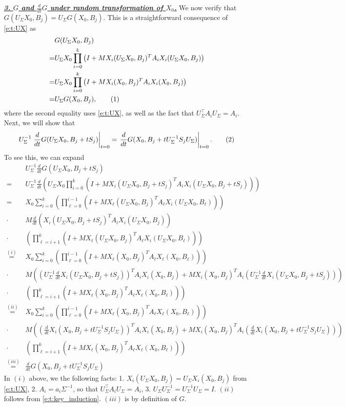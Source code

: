 \documentclass{article}
\newcommand{\emphh}[1]{\textbf{\emph{#1}}}
\newcommand*\lrp[1]{\left( #1 \right)}
\newcommand\numberthis{\addtocounter{equation}{1}\tag{\theequation}}
\newcommand*\at[2]{\left.#1\right|_{#2}}
\newcommand{\US}{U_\Sigma}
\begin{document}
\underline{\emphh{3. $G$ and $\frac{d}{dt} G$ under random transformation of $X_0$.}}
We now verify that $G(\US X_0, B_j) = \US G(X_0, B_j)$. This is a straightforward consequence of \eqref{e:t:UX} as
\begin{align*}
& G(\US X_0, B_j)\\
=& \US X_0 \prod_{i=0}^{k} \lrp{I + M X_i(\US X_0,B_j)^T A_i X_i(\US X_0,B_j)}\\
=& \US X_0 \prod_{i=0}^{k} \lrp{I + M X_i(X_0,B_j)^T A_i X_i(X_0,B_j)}\\
=& \US G(X_0, B_j),
\numberthis \label{e:t:UG}
\end{align*}
where the second equality uses \eqref{e:t:UX}, as well as the fact that $\US^\top A_i \US = A_i$. Next, we will show that
\begin{align*}
\US^{-1} \at{\frac{d}{dt} G(\US X_0, B_j + t S_j)}{t=0} = \at{\frac{d}{dt} G(X_0, B_j + t \US^{-1} S_j \US)}{t=0}.
\numberthis \label{e:t:rmlsdm:3}
\end{align*}
To see this, we can expand
{\allowdisplaybreaks
\begin{align*}
& \US^{-1} \frac{d}{dt} G(\US X_0, B_j + t S_j)\\
=& \US^{-1} \frac{d}{dt} \lrp{\US X_0 \prod_{i=0}^{k} \lrp{I + M X_i(\US X_0,B_j+tS_j)^T A_i X_i(\US X_0,B_j+tS_j)}}\\
=& X_0 \sum_{i=0}^k \lrp{\prod_{\ell=0}^{i-1} \lrp{I + M X_\ell(\US X_0,B_j)^T A_\ell X_i(\US X_0,B_\ell)}}\\
\cdot& M \frac{d}{dt} \lrp{X_i(\US X_0,B_j+tS_j)^T A_i X_i(\US X_0,B_j)}\\
\cdot& \lrp{\prod_{\ell=i+1}^{k} \lrp{I + M X_\ell(\US X_0,B_j)^T A_\ell X_i(\US X_0,B_\ell)}}\\
\overset{(i)}{=}& X_0 \sum_{i=0}^k \lrp{\prod_{\ell=0}^{i-1} \lrp{I + M X_\ell(X_0,B_j)^T A_\ell X_\ell(X_0,B_\ell)}}\\
\cdot& M \lrp{\lrp{\US^{-1} \frac{d}{dt}X_i(\US X_0,B_j+tS_j)}^T A_i X_i(X_0,B_j) + M {X_i(X_0,B_j)}^T A_i \lrp{\US^{-1} \frac{d}{dt}X_i(\US X_0,B_j+tS_j)}}\\
\cdot& \lrp{\prod_{\ell=i+1}^{k} \lrp{I + M X_\ell( X_0,B_j)^T A_\ell X_\ell( X_0,B_\ell)}}\\
\overset{(ii)}{=}& X_0 \sum_{i=0}^k \lrp{\prod_{\ell=0}^{i-1} \lrp{I + M X_\ell(X_0,B_j)^T A_\ell X_\ell(X_0,B_\ell)}}\\
\cdot& M \lrp{\lrp{\frac{d}{dt}X_i( X_0,B_j+t \US^{-1} S_j \US)}^T A_i X_i(X_0,B_j) + M {X_i(X_0,B_j)}^T A_i \lrp{\frac{d}{dt}X_i( X_0,B_j+t\US^{-1} S_j \US)}}\\
\cdot& \lrp{\prod_{\ell=i+1}^{k} \lrp{I + M X_\ell( X_0,B_j)^T A_\ell X_\ell( X_0,B_\ell)}}\\
\overset{(iii)}{=}& \frac{d}{dt} G(X_0, B_j + t \US^{-1} S_j \US)
\end{align*}
}
In $(i)$ above, we  the following facts: 1. $X_i(\US X_0, B_j) = \US X_i(X_0, B_j)$ from \eqref{e:t:UX}, 2. $A_i = a_i \Sigma^{-1}$, so that $\US^{\top} A_i \US = A_i$, 3. $\US\US^{-1} = \US^{-1} \US = I$. $(ii)$ follows from \eqref{e:t:key_induction}. $(iii)$ is by definition of $G$.
\end{document}
